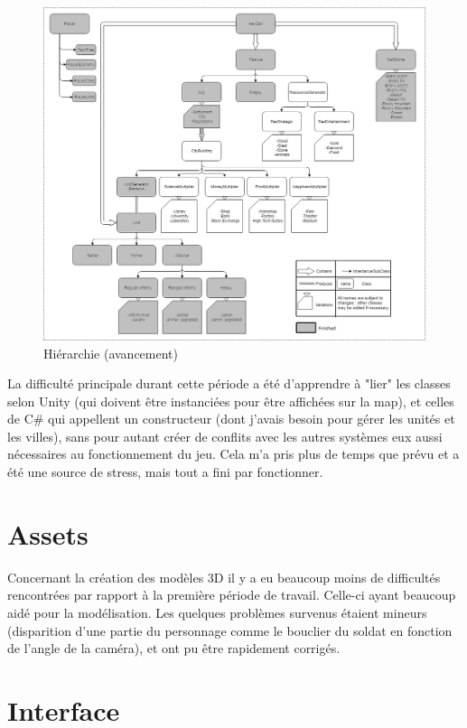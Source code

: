 \documentclass[12pt]{report}
\begin{document}
\begin{figure}[H]
    \centering
    \includegraphics[width=1\textwidth]{class_hierarchy}
    \caption{Hiérarchie (avancement)}
\end{figure}

La difficulté principale durant cette période a été d'apprendre à "lier" les
classes selon Unity (qui doivent être instanciées pour être affichées sur la
map), et celles de C\# qui appellent un constructeur (dont j'avais besoin pour
gérer les unités et les villes), sans pour autant créer de conflits avec les
autres systèmes eux aussi nécessaires au fonctionnement du jeu. Cela m'a pris
plus de temps que prévu et a été une source de stress, mais tout a fini par
fonctionner.

\section*{Assets}

Concernant la création des modèles 3D il y a eu beaucoup moins de difficultés
rencontrées par rapport à la première période de travail. Celle-ci ayant
beaucoup aidé pour la modélisation. Les quelques problèmes survenus étaient
mineurs (disparition d'une partie du personnage comme le bouclier du soldat en
fonction de l'angle de la caméra), et ont pu être rapidement corrigés.

\section*{Interface}
\end{document}
